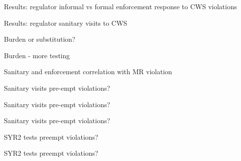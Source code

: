 \documentclass{beamer}
\begin{document}
\begin{frame}{Results: regulator informal vs formal enforcement response to CWS violations}

\end{frame}

\begin{frame}{Results: regulator sanitary visits to CWS}

\end{frame}

\begin{frame}{Burden or substitution?}

\end{frame}

\begin{frame}{Burden - more testing}

\end{frame}

\begin{frame}{Sanitary and enforcement correlation with MR violation}

\end{frame}

\begin{frame}{Sanitary visits pre-empt violations?}
    
\end{frame}

\begin{frame}{Sanitary visits pre-empt violations?}

\end{frame}

\begin{frame}{Sanitary visits pre-empt violations?}
    
\end{frame}

\begin{frame}{SYR2 tests preempt violations?}
    
\end{frame}

\begin{frame}{SYR2 tests preempt violations?}
    
\end{frame}
\end{document}
